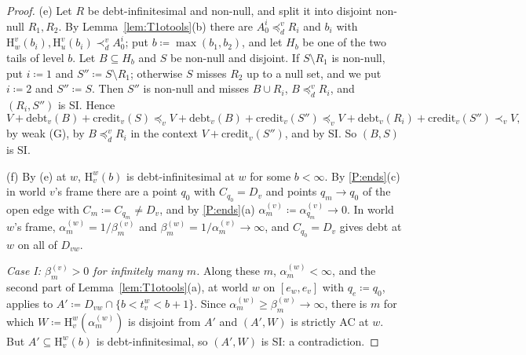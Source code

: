 \documentclass[11pt]{article}
\theoremstyle{definition}\newtheorem{definition}[theorem]{Definition}
\theoremstyle{remark}\newtheorem{remark}[theorem]{Remark}
\newcommand{\debt}{\mathrm{debt}}
\newcommand{\cred}{\mathrm{credit}}
\newcommand{\Hi}[3]{\mathrm H^{#1}_{#2}(#3)}
\begin{document}
\begin{proof}
(e) Let $R$ be debt-infinitesimal and non-null, and split it into disjoint
non-null $R_1,R_2$. By Lemma~\ref{lem:T1otools}(b) there are
$A^i_0\preceq^v_dR_i$ and $b_i$ with $\Hi vw{b_i},\Hi vu{b_i}
\prec^v_dA^i_0$; put $b\coloneqq\max(b_1,b_2)$, and let $H_b$ be one of the
two tails of level $b$. Let $B\subseteq H_b$ and $S$ be non-null and
disjoint. If $S\setminus R_1$ is non-null, put $i\coloneqq1$ and
$S''\coloneqq S\setminus R_1$; otherwise $S$ misses $R_2$ up to a null set,
and we put $i\coloneqq2$ and $S''\coloneqq S$. Then $S''$ is non-null and
misses $B\cup R_i$, $B\preceq^v_dR_i$, and $(R_i,S'')$ is SI. Hence
\[
 V+\debt_v(B)+\cred_v(S)\preceq_vV+\debt_v(B)+\cred_v(S'')\preceq_v
 V+\debt_v(R_i)+\cred_v(S'')\prec_vV,
\]
by weak (G), by $B\preceq^v_dR_i$ in the context $V+\cred_v(S'')$, and by
SI. So $(B,S)$ is SI.

(f) By (e) at $w$, $\Hi wvb$ is debt-infinitesimal at $w$ for some
$b<\infty$. By \ref{P:ends}(c) in world $v$'s frame there are a point $q_0$
with $C_{q_0}=D_v$ and points $q_m\to q_0$ of the open edge with
$C_m\coloneqq C_{q_m}\ne D_v$, and by \ref{P:ends}(a)
$\alpha^{(v)}_m\coloneqq\alpha^{(v)}_{q_m}\to0$. In world $w$'s frame,
$\alpha^{(w)}_m=1/\beta^{(v)}_m$ and $\beta^{(w)}_m=1/\alpha^{(v)}_m\to\infty$,
and $C_{q_0}=D_v$ gives debt at $w$ on all of $D_{vw}$.

\emph{Case I: $\beta^{(v)}_m>0$ for infinitely many $m$.} Along these $m$,
$\alpha^{(w)}_m<\infty$, and the second part of
Lemma~\ref{lem:T1otools}(a), at world $w$ on $[e_w,e_v]$ with $q_e\coloneqq
q_0$, applies to $A'\coloneqq D_{vw}\cap\{b<t^w_v<b+1\}$. Since
$\alpha^{(w)}_m\ge\beta^{(w)}_m\to\infty$, there is $m$ for which
$W\coloneqq\Hi wv{\alpha^{(w)}_m}$ is disjoint from $A'$ and $(A',W)$ is
strictly AC at $w$. But $A'\subseteq\Hi wvb$ is debt-infinitesimal, so
$(A',W)$ is SI: a contradiction.


\end{proof}
\end{document}
